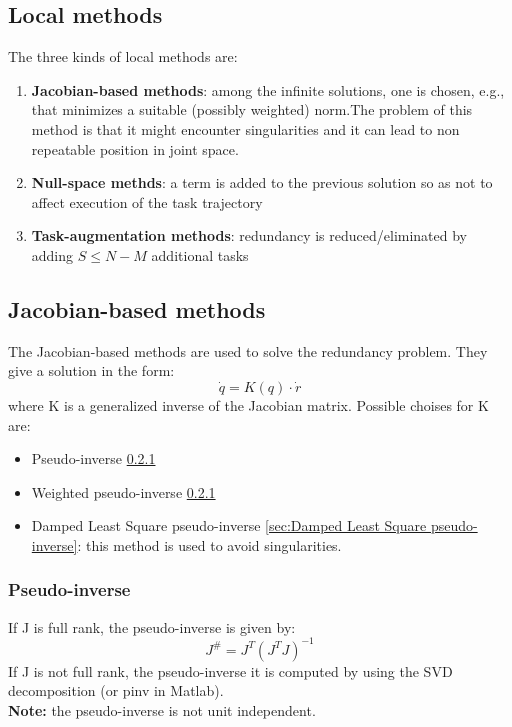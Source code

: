 \documentclass[a4paper,12pt]{article}
\begin{document}
\subsection{Local methods}
The three kinds of local methods are:
\begin{enumerate}
    \item \textbf{Jacobian-based methods}: among the infinite solutions,
     one is chosen, e.g., that minimizes a
    suitable (possibly weighted) norm.The problem of this method is that it 
    might encounter singularities and it can lead to non repeatable position 
    in joint space.
    \item \textbf{Null-space methds}: a term is added to the previous 
    solution so as not to affect execution of the task trajectory
    \item \textbf{Task-augmentation methods}: redundancy is 
    reduced/eliminated by adding $S \leq N - M$ additional tasks
\end{enumerate}
\subsection{Jacobian-based methods}
The Jacobian-based methods are used to solve the redundancy problem.
They give a solution in the form: \begin{equation}
    \dot{q} = K(q) \cdot \dot{r}
\end{equation}
where K is a generalized inverse of the Jacobian matrix. Possible 
choises for K are:
\begin{itemize}
    \item Pseudo-inverse \ref{sec:Pseudo-inverse}
    \item Weighted pseudo-inverse \ref{sec:Pseudo-inverse}
    \item Damped Least Square pseudo-inverse \ref{sec:Damped Least Square pseudo-inverse}:
     this method is used to avoid singularities.
\end{itemize}
    \subsubsection{Pseudo-inverse}\label{sec:Pseudo-inverse}
If J is full rank, the pseudo-inverse is given by:
\begin{equation}
    J^\# = J^T(J^T J)^{-1} 
\end{equation}
If J is not full rank, the pseudo-inverse it 
is computed by using the SVD decomposition (or pinv in Matlab).\\
\textbf{Note:} the pseudo-inverse is not unit independent.
\end{document}
